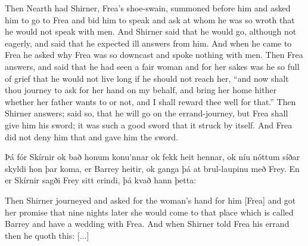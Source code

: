 \bpb\pvb[8]%
Then Nearth had Shirner, Frea’s shoe-swain, summoned before him and asked him to go to Frea and bid him to speak and ask at whom he was so wroth that he would not speak with men.
\pvb And Shirner said that he would go, although not eagerly, and said that he expected ill answers from him.
\pvb And when he came to Frea he asked why Frea was so downcast and spoke nothing with men.
\pvb Then Frea answers, and said that he had seen a fair woman and for her sakes was he so full of grief that he would not live long if he should not reach her,
\pvb “and now shalt thou journey to ask for her hand on my behalf, and bring her home hither whether her father wants to or not, and I shall reward thee well for that.”
\pvb Then Shirner answers; said so, that he will go on the errand-journey, but Frea shall give him his sword; it was such a good sword that it struck by itself.  And Frea did not deny him that and gave him the sword.\epb\epg


\bpg\bpa[0]\pva[14]%
Þá fór Skírnir ok bað honum konu’nnar ok fekk heit hennar, ok níu nóttum síðar skyldi hon þar koma, er Barrey heitir, ok ganga þá at brul-laupinu með Frey.
\pva En er Skírnir sagði Frey sitt erindi, þá kvað hann þetta: \epa

\bpb\pvb[14]%
Then Shirner journeyed and asked for the woman’s hand for him [Frea] and got her promise that nine nights later she would come to that place which is called Barrey and have a wedding with Frea.
\pvb And when Shirner told Frea his errand then he quoth this: [...]\epb\epg
